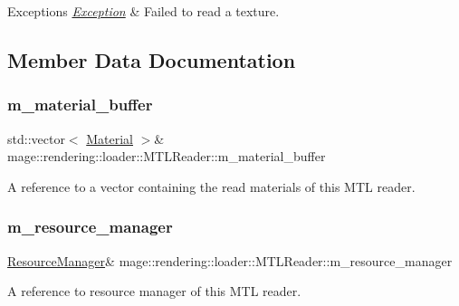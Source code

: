 \begin{DoxyExceptions}{Exceptions}
{\em \hyperlink{classmage_1_1_exception}{Exception}} & Failed to read a texture. \\
\hline
\end{DoxyExceptions}


\subsection{Member Data Documentation}
\hypertarget{classmage_1_1rendering_1_1loader_1_1_m_t_l_reader_ae2fef19220c95fa5593fb43ea86c7293}{}\label{classmage_1_1rendering_1_1loader_1_1_m_t_l_reader_ae2fef19220c95fa5593fb43ea86c7293} 
\subsubsection{\texorpdfstring{m\+\_\+material\+\_\+buffer}{m\_material\_buffer}}
{\footnotesize\ttfamily std\+::vector$<$ \hyperlink{classmage_1_1rendering_1_1_material}{Material} $>$\& mage\+::rendering\+::loader\+::\+M\+T\+L\+Reader\+::m\+\_\+material\+\_\+buffer\hspace{0.3cm}{\ttfamily [private]}}

A reference to a vector containing the read materials of this M\+TL reader. \hypertarget{classmage_1_1rendering_1_1loader_1_1_m_t_l_reader_aa227ae7e44df08b1973171ff165eadb8}{}\label{classmage_1_1rendering_1_1loader_1_1_m_t_l_reader_aa227ae7e44df08b1973171ff165eadb8} 
\subsubsection{\texorpdfstring{m\+\_\+resource\+\_\+manager}{m\_resource\_manager}}
{\footnotesize\ttfamily \hyperlink{classmage_1_1rendering_1_1_resource_manager}{Resource\+Manager}\& mage\+::rendering\+::loader\+::\+M\+T\+L\+Reader\+::m\+\_\+resource\+\_\+manager\hspace{0.3cm}{\ttfamily [private]}}

A reference to resource manager of this M\+TL reader. 